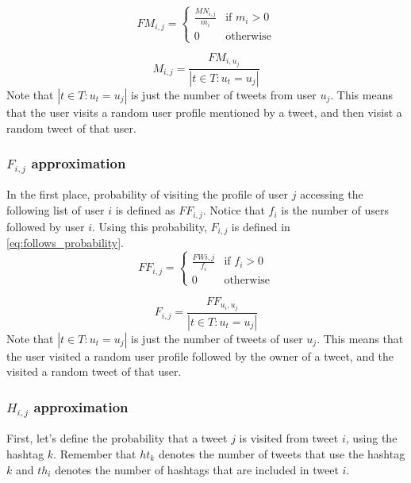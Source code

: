 \begin{equation}
FM_{i,j} = \begin{cases}
\frac{MN_{i,j}}{m_i} & \text{if } m_i > 0 \\
0 & \text{otherwise}
\end{cases}
\end{equation}

\begin{equation}\label{eq:mentions_probability}
M_{i,j} = \frac{FM_{i, u_j}}{ |t \in T : u_t = u_j|}
\end{equation}
Note that $|t \in T : u_t = u_j|$ is just the number of tweets from user $u_j$. This means that the user visits a random user profile mentioned by a tweet, and then visist a random tweet of that user.

\subsubsection*{$F_{i,j}$ approximation}
In the first place, probability of visiting the profile of user $j$ accessing the following list of user $i$ is defined as $FF_{i,j}$. Notice that $f_i$ is the number of users followed by user $i$. Using this probability, $F_{i,j}$ is defined in \ref{eq:follows_probability}.
\begin{equation}
FF_{i,j} = \begin{cases}
\frac{FW{i,j}}{f_i} & \text{if } f_i > 0 \\
0 & \text{otherwise}
\end{cases}
\end{equation}

\begin{equation}\label{eq:follows_probability}
F_{i,j} = \frac{FF_{u_i, u_j}}{ |t \in T : u_t = u_j|}
\end{equation}
Note that $|t \in T : u_t = u_j|$ is just the number of tweets of user $u_j$. This means that the user visited a random user profile followed by the owner of a tweet, and the visited a random tweet of that user. 

\subsubsection*{$H_{i,j}$ approximation}
First, let's define the probability that a tweet $j$ is visited from tweet $i$, using the hashtag $k$. Remember that $ht_k$ denotes the number of tweets that use the hashtag $k$ and $th_i$ denotes the number of hashtags that are included in tweet $i$.

